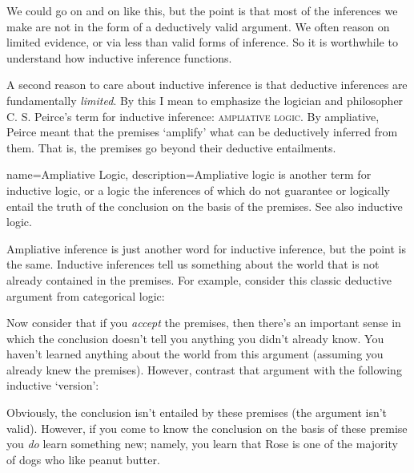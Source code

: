 We could go on and on like this, but the point is that most of the inferences we make are not in the form of a deductively valid argument. We often reason on limited evidence, or via less than valid forms of inference. So it is worthwhile to understand how inductive inference functions.

A second reason to care about inductive inference is that deductive inferences are fundamentally \emph{limited}. By this I mean to emphasize the logician and philosopher C. S. Peirce's term for inductive inference: \textsc{\gls{ampliative logic}}. By ampliative, Peirce meant that the premises `amplify' what can be deductively inferred from them. That is, the premises go beyond their deductive entailments.

{
name=Ampliative Logic,
description={Ampliative logic is another term for inductive logic, or a logic the inferences of which do not guarantee or logically entail the truth of the conclusion on the basis of the premises. See also \gls{inductive logic}.}
}

Ampliative inference is just another word for inductive inference, but the point is the same. Inductive inferences tell us something about the world that is not already contained in the premises. For example, consider this classic deductive argument from categorical logic:

\begin{kormanize}
\end{kormanize}

Now consider that if you \emph{accept} the premises, then there's an important sense in which the conclusion doesn't tell you anything you didn't already know. You haven't learned anything about the world from this argument (assuming you already knew the premises). However, contrast that argument with the following inductive `version': 

\begin{kormanize}
\end{kormanize}

Obviously, the conclusion isn't entailed by these premises (the argument isn't valid). However, if you come to know the conclusion on the basis of these premise you \emph{do} learn something new; namely, you learn that Rose is one of the majority of dogs who like peanut butter. 


